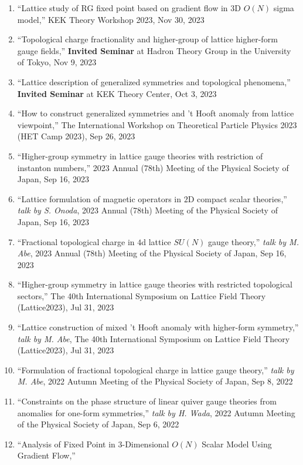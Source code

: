 \begin{enumerate}
 \item ``Lattice study of RG fixed point based on gradient flow in $3$D $O(N)$ sigma model,''
       KEK Theory Workshop 2023, Nov 30, 2023
 \item ``Topological charge fractionality and higher-group of lattice higher-form gauge fields,''
       \textbf{Invited Seminar} at Hadron Theory Group in the University of Tokyo, Nov 9, 2023
 \item ``Lattice description of generalized symmetries and topological phenomena,''
       \textbf{Invited Seminar} at KEK Theory Center, Oct 3, 2023
 \item ``How to construct generalized symmetries and 't Hooft anomaly from lattice viewpoint,''
       The International Workshop on Theoretical Particle Physics 2023 (HET Camp 2023), Sep 26, 2023
 \item ``Higher-group symmetry in lattice gauge theories with restriction of instanton numbers,''
       2023 Annual (78th) Meeting of the Physical Society of Japan, Sep 16, 2023
 \item ``Lattice formulation of magnetic operators in $2$D compact scalar theories,''
       \textit{talk by S. Onoda},
       2023 Annual (78th) Meeting of the Physical Society of Japan, Sep 16, 2023
 \item ``Fractional topological charge in $4$d lattice $SU(N)$ gauge theory,''
       \textit{talk by M. Abe},
       2023 Annual (78th) Meeting of the Physical Society of Japan, Sep 16, 2023
 \item ``Higher-group symmetry in lattice gauge theories with restricted topological sectors,''
       The 40th International Symposium on Lattice Field Theory (Lattice2023), Jul 31, 2023
 \item ``Lattice construction of mixed 't Hooft anomaly with higher-form symmetry,''
       \textit{talk by M. Abe},
       The 40th International Symposium on Lattice Field Theory (Lattice2023), Jul 31, 2023
 \item ``Formulation of fractional topological charge in lattice gauge theory,''
       \textit{talk by M. Abe},
       2022 Autumn Meeting of the Physical Society of Japan, Sep 8, 2022
 \item ``Constraints on the phase structure of linear quiver gauge theories from anomalies for one-form symmetries,''
       \textit{talk by H. Wada},
       2022 Autumn Meeting of the Physical Society of Japan, Sep 6, 2022
 \item ``Analysis of Fixed Point in $3$-Dimensional $O(N)$ Scalar Model Using Gradient Flow,''

\end{enumerate}
